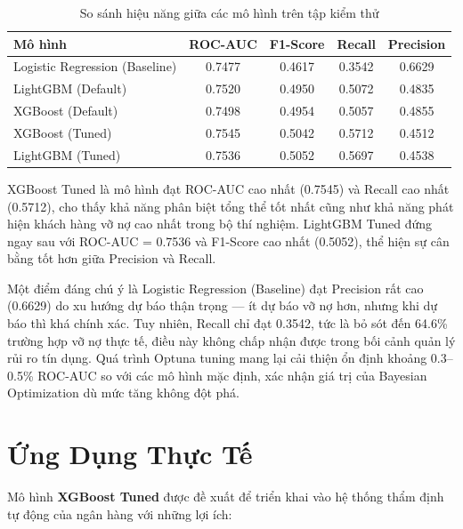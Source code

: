 \begin{table}[H]
    \centering
    \caption{So sánh hiệu năng giữa các mô hình trên tập kiểm thử}
    \label{tab:model_comparison_updated}
    \begin{tabular}{|l|c|c|c|c|}
        \hline
        \rowcolor{Gray}
        \textbf{Mô hình} & \textbf{ROC-AUC} & \textbf{F1-Score} & \textbf{Recall} & \textbf{Precision} \\ \hline
        Logistic Regression (Baseline) & 0.7477 & 0.4617 & 0.3542 & 0.6629 \\ \hline
        LightGBM (Default) & 0.7520 & 0.4950 & 0.5072 & 0.4835 \\ \hline
        XGBoost (Default) & 0.7498 & 0.4954 & 0.5057 & 0.4855 \\ \hline
        XGBoost (Tuned) & 0.7545 & 0.5042 & 0.5712 & 0.4512 \\ \hline
        LightGBM (Tuned) & 0.7536 & 0.5052 & 0.5697 & 0.4538 \\ \hline
    \end{tabular}
\end{table}

XGBoost Tuned là mô hình đạt ROC-AUC cao nhất (0.7545) và Recall cao nhất (0.5712), cho thấy khả năng phân biệt tổng thể tốt nhất cũng như khả năng phát hiện khách hàng vỡ nợ cao nhất trong bộ thí nghiệm. LightGBM Tuned đứng ngay sau với ROC-AUC = 0.7536 và F1-Score cao nhất (0.5052), thể hiện sự cân bằng tốt hơn giữa Precision và Recall.

Một điểm đáng chú ý là Logistic Regression (Baseline) đạt Precision rất cao (0.6629) do xu hướng dự báo thận trọng --- ít dự báo vỡ nợ hơn, nhưng khi dự báo thì khá chính xác. Tuy nhiên, Recall chỉ đạt 0.3542, tức là bỏ sót đến 64.6\% trường hợp vỡ nợ thực tế, điều này không chấp nhận được trong bối cảnh quản lý rủi ro tín dụng. Quá trình Optuna tuning mang lại cải thiện ổn định khoảng 0.3--0.5\% ROC-AUC so với các mô hình mặc định, xác nhận giá trị của Bayesian Optimization dù mức tăng không đột phá.

\section{Ứng Dụng Thực Tế}

Mô hình \textbf{XGBoost Tuned} được đề xuất để triển khai vào hệ thống thẩm định tự động của ngân hàng với những lợi ích:

